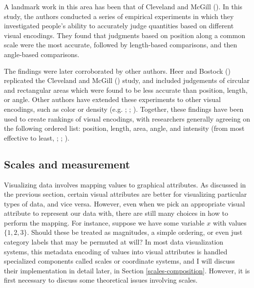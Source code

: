 \documentclass[
]{book}
\theoremstyle{definition}
\theoremstyle{definition}
\theoremstyle{definition}
\theoremstyle{definition}
\theoremstyle{remark}
\begin{document}
A landmark work in this area has been that of Cleveland and McGill (). In this study, the authors conducted a series of empirical experiments in which they investigated people's ability to accurately judge quantities based on different visual encodings. They found that judgments based on position along a common scale were the most accurate, followed by length-based comparisons, and then angle-based comparisons.

The findings were later corroborated by other authors. Heer and Bostock () replicated the Cleveland and McGill () study, and included judgements of circular and rectangular areas which were found to be less accurate than position, length, or angle. Other authors have extended these experiments to other visual encodings, such as color or density (e.g. ; ; ). Together, these findings have been used to create rankings of visual encodings, with researchers generally agreeing on the following ordered list: position, length, area, angle, and intensity (from most effective to least, ; ; ).

\subsection{Scales and measurement}\label{scales-measurement}

Visualizing data involves mapping values to graphical attributes. As discussed in the previous section, certain visual attributes are better for visualizing particular types of data, and vice versa. However, even when we pick an appropriate visual attribute to represent our data with, there are still many choices in how to perform the mapping. For instance, suppose we have some variable \(x\) with values \(\{ 1, 2, 3 \}\). Should these be treated as magnitudes, a simple ordering, or even just category labels that may be permuted at will? In most data visualization systems, this metadata encoding of values into visual attributes is handled specialized components called scales or coordinate systems, and I will discuss their implementation in detail later, in Section \ref{scales-composition}. However, it is first necessary to discuss some theoretical issues involving scales.
\end{document}
